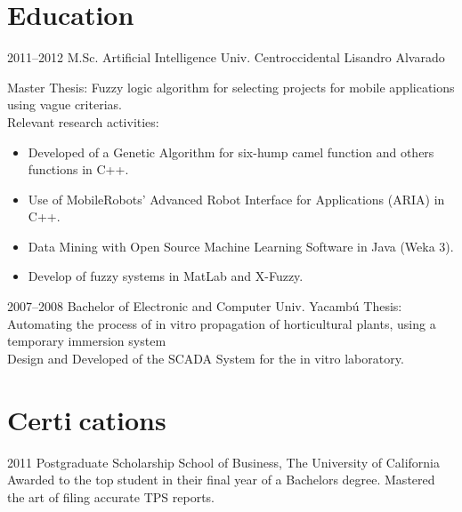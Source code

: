\documentclass[a4paper,nocolors]{cv-friggeri-x}
\begin{document}
\section{Education}

\begin{entrylist}


\entry
{2011--2012}
{M.Sc. {\normalfont Artificial Intelligence}}
{Univ. Centroccidental Lisandro Alvarado}
{Master Thesis: Fuzzy logic algorithm for selecting projects for mobile applications using
vague criterias.\\
Relevant research activities:
\begin{itemize}
\item Developed of a Genetic Algorithm for six-hump camel function and others functions in C++.
\item Use of MobileRobots' Advanced Robot Interface for Applications (ARIA) in C++.
\item Data Mining with Open Source Machine Learning Software in Java (Weka 3).
\item Develop of fuzzy systems in MatLab and X-Fuzzy.
\end{itemize}
}


\entry
{2007--2008}
{Bachelor {\normalfont of Electronic and Computer}}
{Univ. Yacambú}
{Thesis: Automating the process of in vitro propagation of horticultural plants, using a
temporary immersion system\\
Design and Developed of the SCADA System for the in vitro laboratory.}


\end{entrylist}



\section{Certications}

\begin{entrylist}


\entry
{2011}
{Postgraduate Scholarship}
{School of Business, The University of California}
{Awarded to the top student in their final year of a Bachelors degree. Mastered the art of filing accurate TPS reports.}


\end{entrylist}
\end{document}
